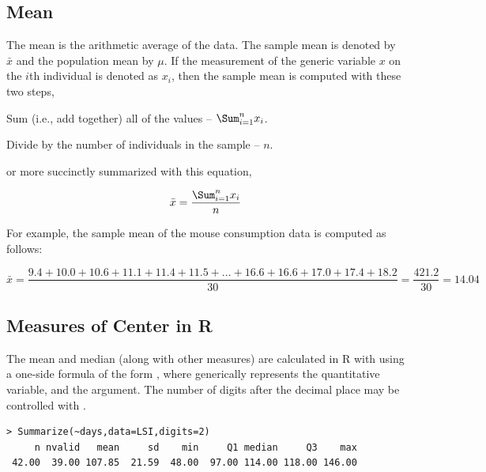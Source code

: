 \documentclass[10pt,openany]{book}\usepackage[]{graphicx}\usepackage[]{color}
\makeatletter
\newenvironment{kframe}{%
 \def\at@end@of@kframe{}%
 \ifinner\ifhmode%
  \def\at@end@of@kframe{\end{minipage}}%
  \begin{minipage}{\columnwidth}%
 \fi\fi%
 \def\FrameCommand##1{\hskip\@totalleftmargin \hskip-\fboxsep
 \colorbox{shadecolor}{##1}\hskip-\fboxsep
     \hskip-\linewidth \hskip-\@totalleftmargin \hskip\columnwidth}%
 \MakeFramed {\advance\hsize-\width
   \@totalleftmargin\z@ \linewidth\hsize
   \@setminipage}}%
 {\par\unskip\endMakeFramed%
 \at@end@of@kframe}
\newenvironment{knitrout}{}{} %
\makeatother
\begin{document}
\subsection{Mean}
The mean is the arithmetic average of the data.  The sample mean is denoted by $\bar{x}$ and the population mean by $\mu$.  If the measurement of the generic variable $x$ on the $i$th individual is denoted as $x_{i}$, then the sample mean is computed with these two steps,
\begin{Enumerate}
  \item Sum (i.e., add together) all of the values -- $\Sum_{i=1}^{n}x_{i}$.
  \item Divide by the number of individuals in the sample -- $n$.
\end{Enumerate}
or more succinctly summarized with this equation,

\begin{equation} \label{eqn:SampleMean}
     \bar{x} = \frac{\Sum_{i=1}^{n}x_{i}}{n}
\end{equation}

For example, the sample mean of the mouse consumption data is computed as follows:

\[ \bar{x} = \frac{9.4+10.0+10.6+11.1+11.4+11.5+ ... +16.6+16.6+17.0+17.4+18.2}{30} = \frac{421.2}{30} = 14.04  \]



\subsection{Measures of Center in R} \label{sect:DescStatsCenter}
\vspace{-12pt}
The mean and median (along with other measures) are calculated in R with  using a one-side formula of the form , where  generically represents the quantitative variable, and the  argument.  The number of digits after the decimal place may be controlled with .
\begin{knitrout}
\color{fgcolor}\begin{kframe}
\begin{verbatim}
> Summarize(~days,data=LSI,digits=2)
     n nvalid   mean     sd    min     Q1 median     Q3    max 
 42.00  39.00 107.85  21.59  48.00  97.00 114.00 118.00 146.00 
\end{verbatim}
\end{kframe}
\end{knitrout}
\end{document}
